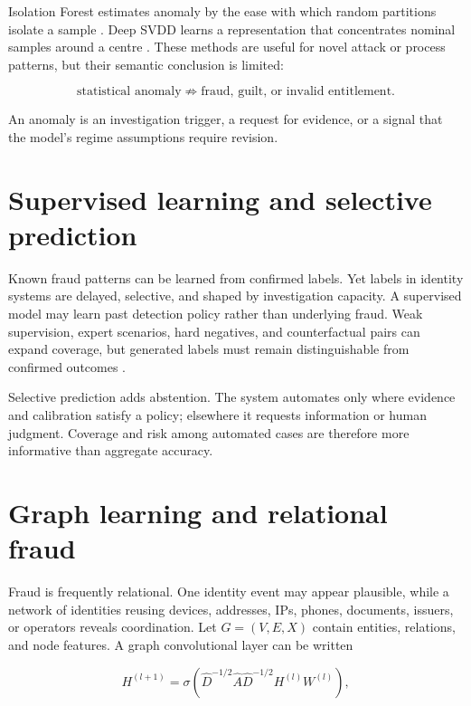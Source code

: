 Isolation Forest estimates anomaly by the ease with which random partitions isolate a sample \citep{liu2008isolation}. Deep SVDD learns a representation that concentrates nominal samples around a centre \citep{ruff2018deep}. These methods are useful for novel attack or process patterns, but their semantic conclusion is limited:

\begin{equation}
\text{statistical anomaly}\not\Rightarrow\text{fraud, guilt, or invalid entitlement}.
\end{equation}

An anomaly is an investigation trigger, a request for evidence, or a signal that the model's regime assumptions require revision.

\section{Supervised learning and selective prediction}

Known fraud patterns can be learned from confirmed labels. Yet labels in identity systems are delayed, selective, and shaped by investigation capacity. A supervised model may learn past detection policy rather than underlying fraud. Weak supervision, expert scenarios, hard negatives, and counterfactual pairs can expand coverage, but generated labels must remain distinguishable from confirmed outcomes \citep{ratner2017snorkel}.

Selective prediction adds abstention. The system automates only where evidence and calibration satisfy a policy; elsewhere it requests information or human judgment. Coverage and risk among automated cases are therefore more informative than aggregate accuracy.

\section{Graph learning and relational fraud}

Fraud is frequently relational. One identity event may appear plausible, while a network of identities reusing devices, addresses, IPs, phones, documents, issuers, or operators reveals coordination. Let $G=(V,E,X)$ contain entities, relations, and node features. A graph convolutional layer can be written

\begin{equation}
H^{(l+1)}=\sigma\left(\hat{D}^{-1/2}\hat{A}\hat{D}^{-1/2}H^{(l)}W^{(l)}\right),
\end{equation}

